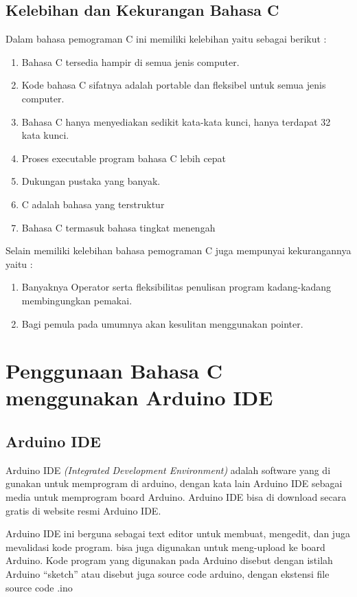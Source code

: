 \subsection{Kelebihan dan Kekurangan Bahasa C}
Dalam bahasa pemograman C ini memiliki  kelebihan yaitu sebagai berikut :
\begin{enumerate}
\item Bahasa C tersedia hampir di semua jenis computer. 
\item Kode bahasa C sifatnya adalah portable dan fleksibel untuk semua jenis computer. 
\item Bahasa C hanya menyediakan sedikit kata-kata kunci, hanya terdapat 32 kata kunci.
\item Proses executable program bahasa C lebih cepat 
\item Dukungan pustaka yang banyak.
\item C adalah bahasa yang terstruktur 
\item Bahasa C termasuk bahasa tingkat menengah

\end{enumerate}

Selain memiliki kelebihan bahasa pemograman C juga mempunyai kekurangannya yaitu :
\begin{enumerate}
    \item Banyaknya Operator serta fleksibilitas penulisan program kadang-kadang membingungkan pemakai. 
    \item Bagi pemula pada umumnya akan kesulitan menggunakan pointer.
\end{enumerate}

\section{Penggunaan Bahasa C menggunakan Arduino IDE}
\subsection{Arduino IDE}
Arduino IDE \textit{(Integrated Development Environment)} adalah software yang di gunakan untuk memprogram di arduino, dengan kata lain Arduino IDE sebagai media untuk memprogram board Arduino. Arduino IDE bisa di download secara gratis di website resmi Arduino IDE.

Arduino IDE ini berguna sebagai text editor  untuk membuat,  mengedit, dan juga mevalidasi kode program. bisa juga digunakan untuk meng-upload ke board Arduino.  Kode program yang digunakan pada Arduino disebut dengan istilah Arduino “sketch”  atau disebut juga source code arduino, dengan ekstensi file source code .ino

